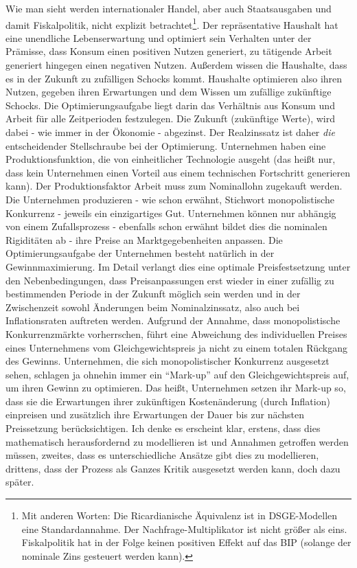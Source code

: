Wie man sieht werden internationaler Handel, aber auch Staatsausgaben und damit Fiskalpolitik, nicht explizit betrachtet\footnote{Mit anderen Worten: Die Ricardianische Äquivalenz ist in DSGE-Modellen eine Standardannahme. Der Nachfrage-Multiplikator ist nicht größer als eins. Fiskalpolitik hat in der Folge keinen positiven Effekt auf das BIP (solange der nominale Zins gesteuert werden kann).}. Der repräsentative Haushalt hat eine unendliche Lebenserwartung und optimiert sein Verhalten unter der Prämisse, dass Konsum einen positiven Nutzen generiert, zu tätigende Arbeit generiert hingegen einen negativen Nutzen. Außerdem wissen die Haushalte, dass es in der Zukunft zu zufälligen Schocks kommt. Haushalte optimieren also ihren Nutzen, gegeben ihren Erwartungen und dem Wissen um zufällige zukünftige Schocks. Die Optimierungsaufgabe liegt darin das Verhältnis aus Konsum und Arbeit für alle Zeitperioden festzulegen. Die Zukunft (zukünftige Werte), wird dabei - wie immer in der Ökonomie - abgezinst. Der Realzinssatz ist daher \textit{die} entscheidender Stellschraube bei der Optimierung.
Unternehmen haben eine Produktionsfunktion, die von einheitlicher Technologie ausgeht (das heißt nur, dass kein Unternehmen einen Vorteil aus einem technischen Fortschritt generieren kann). Der Produktionsfaktor Arbeit muss zum Nominallohn zugekauft werden. Die Unternehmen produzieren - wie schon erwähnt, Stichwort monopolistische Konkurrenz - jeweils ein einzigartiges Gut. Unternehmen können nur abhängig von einem Zufallsprozess - ebenfalls schon erwähnt bildet dies die nominalen Rigiditäten ab - ihre Preise an Marktgegebenheiten anpassen. Die Optimierungsaufgabe der Unternehmen besteht natürlich in der Gewinnmaximierung. Im Detail verlangt dies eine optimale Preisfestsetzung unter den Nebenbedingungen, dass Preisanpassungen erst wieder in einer zufällig zu bestimmenden Periode in der Zukunft möglich sein werden und in der Zwischenzeit sowohl Änderungen beim Nominalzinssatz, also auch bei Inflationsraten auftreten werden. Aufgrund der Annahme, dass monopolistische Konkurrenzmärkte vorherrschen, führt eine Abweichung des individuellen Preises eines Unternehmens vom Gleichgewichtspreis ja nicht zu einem totalen Rückgang des Gewinns. Unternehmen, die sich monopolistischer Konkurrenz ausgesetzt sehen, schlagen ja ohnehin immer ein "`Mark-up"' auf den Gleichgewichtspreis auf, um ihren Gewinn zu optimieren. Das heißt, Unternehmen setzen ihr Mark-up so, dass sie die Erwartungen ihrer zukünftigen Kostenänderung (durch Inflation) einpreisen und zusätzlich ihre Erwartungen der Dauer bis zur nächsten Preissetzung berücksichtigen. Ich denke es erscheint klar, erstens, dass dies mathematisch herausfordernd zu modellieren ist und Annahmen getroffen werden müssen, zweites, dass es unterschiedliche Ansätze gibt dies zu modellieren, drittens, dass der Prozess als Ganzes Kritik ausgesetzt werden kann, doch dazu später.
